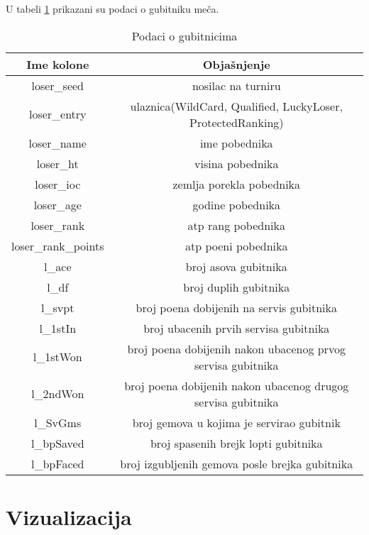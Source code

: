 \documentclass[a4paper]{article}
\begin{document}
U tabeli \ref{table:gubitnici} prikazani su podaci o gubitniku meča.
\begin{table}
		\begin{tabular}{ | c | c | } 
			\hline
			Ime kolone & Objašnjenje \\ 
			\hline
			loser\_seed & nosilac na turniru \\
			loser\_entry & ulaznica(WildCard, Qualified, LuckyLoser, ProtectedRanking) \\
			loser\_name & ime pobednika \\
			loser\_ht & visina pobednika \\
			loser\_ioc & zemlja porekla pobednika \\
			loser\_age & godine pobednika \\
			loser\_rank & atp rang pobednika \\
			loser\_rank\_points & atp poeni pobednika \\ 
			l\_ace & broj asova gubitnika \\
			l\_df & broj duplih gubitnika \\
			l\_svpt & broj poena dobijenih na servis gubitnika \\
			l\_1stIn & broj ubacenih prvih servisa gubitnika \\
			l\_1stWon & broj poena dobijenih nakon ubacenog prvog servisa gubitnika \\
			l\_2ndWon & broj poena dobijenih nakon ubacenog drugog servisa gubitnika \\
			l\_SvGms & broj gemova u kojima je servirao gubitnik \\
			l\_bpSaved & broj spasenih brejk lopti gubitnika \\
			l\_bpFaced & broj izgubljenih gemova posle brejka gubitnika \\
			\hline
		\end{tabular}
	\caption{Podaci o gubitnicima}
	\label{table:gubitnici}
\end{table}

\section{Vizualizacija}
\end{document}
